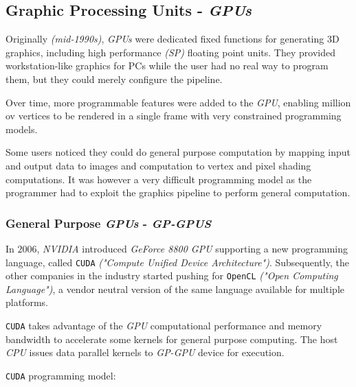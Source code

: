 \documentclass[english]{article}
\begin{document}
\subsection{Graphic Processing Units - \textit{GPUs}}

Originally \textit{(mid-1990s)}, \textit{GPUs} were dedicated fixed functions for generating 3D graphics, including high performance \textit{(SP)} floating point units.
They provided workstation-like graphics for PCs while the user had no real way to program them, but they could merely configure the pipeline.

Over time, more programmable features were added to the \textit{GPU}, enabling million ov vertices to be rendered in a single frame with very constrained programming models.

Some users noticed they could do general purpose computation by mapping input and output data to images and computation to vertex and pixel shading computations.
It was however a very difficult programming model as the programmer had to exploit the graphics pipeline to perform general computation.

\subsubsection{General Purpose \textit{GPUs} - \textit{GP-GPUS}}

In \(2006\), \textit{NVIDIA} introduced \textit{GeForce 8800 GPU} supporting a new programming language, called \texttt{CUDA} \textit{("Compute Unified Device Architecture")}.
Subsequently, the other companies in the industry started pushing for \texttt{OpenCL} \textit{("Open Computing Language")}, a vendor neutral version of the same language available for multiple platforms.

\texttt{CUDA} takes advantage of the \textit{GPU} computational performance and memory bandwidth to accelerate some kernels for general purpose computing.
The host \textit{CPU} issues data parallel kernels to \textit{GP-GPU} device for execution.

\bigskip
\texttt{CUDA} programming model:
\end{document}
